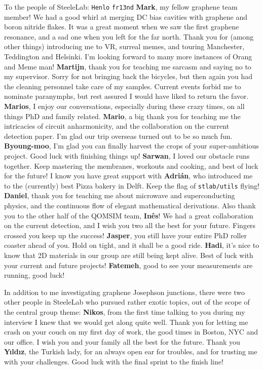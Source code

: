 To the people of SteeleLab:
%
\texttt{Henlo} \texttt{fr13nd} \textbf{Mark}, my fellow graphene team member!
%
We had a good whirl at merging DC bias cavities with graphene and boron nitride flakes.
%
It was a great moment when we saw the first graphene resonance, and a sad one when you left for the far north.
%
Thank you for (among other things) introducing me to VR, surreal memes, and touring Manchester, Teddington and Helsinki.
%
I'm looking forward to many more instances of Orang and Meme man!
%
\textbf{Martijn}, thank you for teaching me sarcasm and saying no to my supervisor.
%
Sorry for not bringing back the bicycles, but then again you had the cleaning personnel take care of my samples.
%
Current events forbid me to nominate paranymphs, but rest assured I would have liked to return the favor.
%
\textbf{Marios}, I enjoy our conversations, especially during these crazy times, on all things PhD and family related.
%
\textbf{Mario}, a big thank you for teaching me the intricacies of circuit anharmonicity, and the collaboration on the current detection paper.
%
I'm glad our trip overseas turned out to be so much fun.
%
\textbf{Byoung-moo}, I'm glad you can finally harvest the crops of your super-ambitious project.
%
Good luck with finishing things up!
%
\textbf{Sarwan}, I loved our obstacle runs together.
%
Keep mastering the membranes, workouts and cooking, and best of luck for the future!
%
I know you have great support with \textbf{Adrián}, who introduced me to the (currently) best Pizza bakery in Delft.
%
Keep the flag of \texttt{stlab/utils} flying!
%
\textbf{Daniel}, thank you for teaching me about microwave and superconducting physics, and the continuous flow of elegant mathematical derivations.
%
Also thank you to the other half of the QOMSIM team, \textbf{Inês}!
%
We had a great collaboration on the current detection, and I wish you two all the best for your future.
%
Fingers crossed you keep up the success!
%
\textbf{Jasper}, you still have your entire PhD roller coaster ahead of you.
%
Hold on tight, and it shall be a good ride.
%
\textbf{Hadi}, it's nice to know that 2D materials in our group are still being kept alive.
%
Best of luck with your current and future projects!
%
\textbf{Fatemeh}, good to see your measurements are running, good luck!

In addition to me investigating graphene Josephson junctions, there were two other people in SteeleLab who pursued rather exotic topics, out of the scope of the central group theme:
%
\textbf{Nikos}, from the first time talking to you during my interview I knew that we would get along quite well.
%
Thank you for letting me crash on your couch on my first day of work, the good times in Boston, NYC and our office.
%
I wish you and your family all the best for the future.
%
Thank you \textbf{Yıldız}, the Turkish lady, for an always open ear for troubles, and for trusting me with your challenges.
%
Good luck with the final sprint to the finish line!

